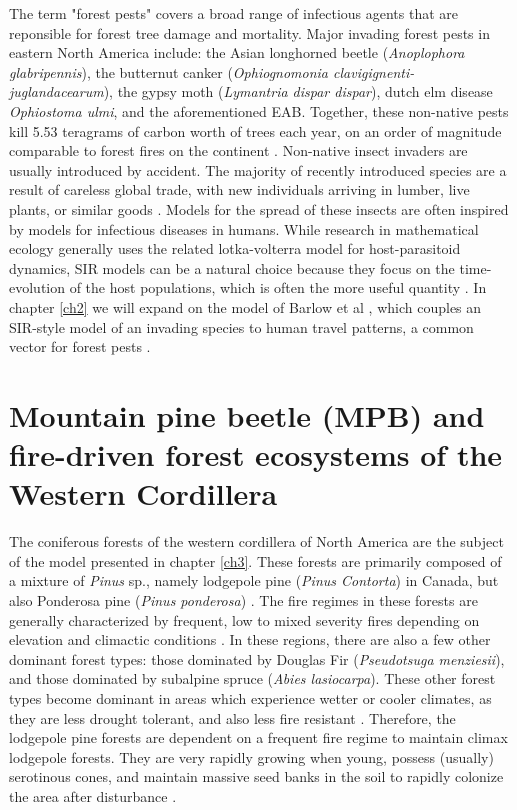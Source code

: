 The term "forest pests" covers a broad range of infectious agents that are reponsible for forest tree damage and mortality. Major invading forest pests in eastern North America include: the Asian longhorned beetle (\textit{Anoplophora glabripennis}), the butternut canker (\textit{Ophiognomonia clavigignenti-juglandacearum}), the gypsy moth (\textit{Lymantria dispar dispar}), dutch elm disease \textit{Ophiostoma ulmi}, and the aforementioned EAB. Together, these non-native pests kill 5.53 teragrams of carbon worth of trees each year, on an order of magnitude comparable to forest fires on the continent \cite{fei2019biomass}. Non-native insect invaders are usually introduced by accident. The majority of recently introduced species are a result of careless global trade, with new individuals arriving in lumber, live plants, or similar goods \cite{brockerhoff2017ecology}. Models for the spread of these insects are often inspired by models for infectious diseases in humans. While research in mathematical ecology generally uses the related lotka-volterra model for host-parasitoid dynamics, SIR models can be a natural choice because they focus on the time-evolution of the host populations, which is often the more useful quantity \cite{edelstein2005mathematical}. In chapter \ref{ch2} we will expand on the model of Barlow et al \cite{barlow2014modelling}, which couples an SIR-style model of an invading species to human travel patterns, a common vector for forest pests \cite{buck2009hitchhiking,kolar2001progress,wilson2009something}.

\section{Mountain pine beetle (MPB) and fire-driven forest ecosystems of the Western Cordillera}

The coniferous forests of the western cordillera of North America are the subject of the model presented in chapter \ref{ch3}. These forests are primarily composed of a mixture of \textit {Pinus} sp., namely lodgepole pine (\textit{Pinus Contorta}) in Canada, but also Ponderosa pine (\textit{Pinus ponderosa}) \cite{brown2010impact}. The fire regimes in these forests are generally characterized by frequent, low to mixed severity fires depending on elevation and climactic conditions \cite{agee1996fire,arno1980forest}. In these regions, there are also a few other dominant forest types: those dominated by Douglas Fir (\textit{Pseudotsuga menziesii}), and those dominated by subalpine spruce (\textit{Abies lasiocarpa}). These other forest types become dominant in areas which experience wetter or cooler climates, as they are less drought tolerant, and also less fire resistant \cite{JENKINS200816}. Therefore, the lodgepole pine forests are dependent on a frequent fire regime to maintain climax lodgepole forests. They are very rapidly growing when young, possess (usually) serotinous cones, and maintain massive seed banks in the soil to rapidly colonize the area after disturbance \cite{lotan1976cone,lotan1985role}.

